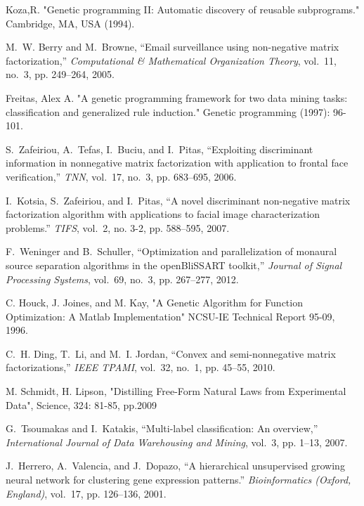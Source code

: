 \documentclass[10pt,journal,compsoc]{IEEEtran}
\begin{document}
\begin{thebibliography}{10}
Koza,R. "Genetic programming II: Automatic discovery of reusable subprograms." Cambridge, MA, USA (1994).

	M.~W. Berry and M.~Browne, ``Email surveillance using non-negative matrix
	factorization,'' \emph{Computational \& Mathematical Organization Theory},
	vol.~11, no.~3, pp. 249--264, 2005.
	
Freitas, Alex A. "A genetic programming framework for two data mining tasks: classification and generalized rule induction." Genetic programming (1997): 96-101.
	
	S.~Zafeiriou, A.~Tefas, I.~Buciu, and I.~Pitas, ``Exploiting discriminant
	information in nonnegative matrix factorization with application to frontal
	face verification,'' \emph{TNN}, vol.~17, no.~3, pp. 683--695, 2006.
	
	I.~Kotsia, S.~Zafeiriou, and I.~Pitas, ``A novel discriminant non-negative
	matrix factorization algorithm with applications to facial image
	characterization problems.'' \emph{TIFS}, vol.~2, no. 3-2, pp. 588--595,
	2007.


	F.~Weninger and B.~Schuller, ``{Optimization and parallelization of monaural
		source separation algorithms in the openBliSSART toolkit},'' \emph{Journal of
		Signal Processing Systems}, vol.~69, no.~3, pp. 267--277, 2012.
	
		
	C. Houck, J. Joines, and M. Kay,
	"A Genetic Algorithm for Function Optimization: A Matlab Implementation"
	NCSU-IE Technical Report 95-09, 1996.
	

	
	C.~H. Ding, T.~Li, and M.~I. Jordan, ``Convex and semi-nonnegative matrix
	factorizations,'' \emph{IEEE TPAMI}, vol.~32, no.~1, pp. 45--55, 2010.
	
	M. Schmidt, H. Lipson, "Distilling Free-Form Natural Laws from Experimental Data",  Science, 324: 81-85, pp.2009
	
	G.~Tsoumakas and I.~Katakis, ``{Multi-label classification: An overview},''
	\emph{International Journal of Data Warehousing and Mining}, vol.~3, pp.
	1--13, 2007.
	
	J.~Herrero, A.~Valencia, and J.~Dopazo, ``{A hierarchical unsupervised growing
		neural network for clustering gene expression patterns.}''
	\emph{Bioinformatics (Oxford, England)}, vol.~17, pp. 126--136, 2001.
	

\end{thebibliography}
\end{document}
